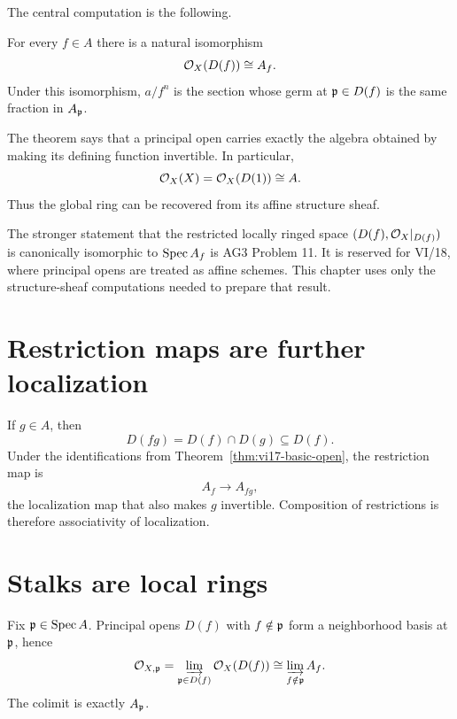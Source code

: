 The central computation is the following.

\begin{theorem}\label{thm:vi17-basic-open}
For every $f\in A$ there is a natural isomorphism
\[
\mathcal O_X(D(f))\cong A_f.
\]
Under this isomorphism, $a/f^n$ is the section whose germ at
$\mathfrak p\in D(f)$ is the same fraction in $A_{\mathfrak p}$.
\end{theorem}

The theorem says that a principal open carries exactly the algebra obtained by making its
defining function invertible.  In particular,
\[
\mathcal O_X(X)=\mathcal O_X(D(1))\cong A.
\]
Thus the global ring can be recovered from its affine structure sheaf.



\begin{remark}
The stronger statement that the restricted locally ringed space
$(D(f),\mathcal O_X|_{D(f)})$ is canonically isomorphic to $\operatorname{Spec} A_f$ is AG3 Problem 11.  It is
reserved for VI/18, where principal opens are treated as affine schemes.  This chapter uses
only the structure-sheaf computations needed to prepare that result.
\end{remark}

\section{Restriction maps are further localization}

If $g\in A$, then
\[
D(fg)=D(f)\cap D(g)\subseteq D(f).
\]
Under the identifications from Theorem~\ref{thm:vi17-basic-open}, the restriction map is
\[
A_f\longrightarrow A_{fg},
\]
the localization map that also makes $g$ invertible.  Composition of restrictions is
therefore associativity of localization.



\section{Stalks are local rings}

Fix $\mathfrak p\in\operatorname{Spec} A$.  Principal opens $D(f)$ with $f\notin\mathfrak p$ form a neighborhood
basis at $\mathfrak p$, hence
\[
\mathcal O_{X,\mathfrak p}
=\varinjlim_{\mathfrak p\in D(f)}\mathcal O_X(D(f))
\cong
\varinjlim_{f\notin\mathfrak p} A_f.
\]
The colimit is exactly $A_{\mathfrak p}$.

